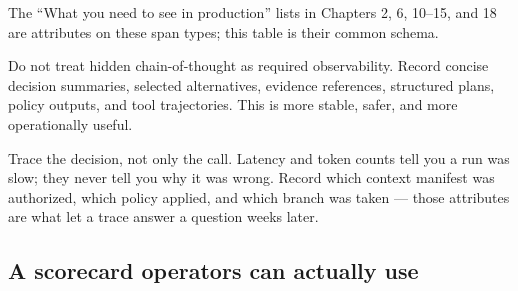 The “What you need to see in production” lists in Chapters 2, 6, 10–15, and 18 are attributes on these span types; this table is their common schema.\par

Do not treat hidden chain-of-thought as required observability. Record concise decision summaries, selected alternatives, evidence references, structured plans, policy outputs, and tool trajectories. This is more stable, safer, and more operationally useful.\par

\begin{bookobservability}
Trace the decision, not only the call. Latency and token counts tell you a run was slow; they never tell you why it was wrong. Record which context manifest was authorized, which policy applied, and which branch was taken — those attributes are what let a trace answer a question weeks later.
\end{bookobservability}

\subsection{A scorecard operators can actually use}

